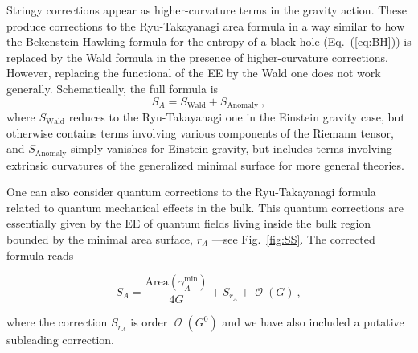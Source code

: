 \documentclass[twocolumn]{revtex4}
\providecommand{\eq}[2]{
    \begin{equation}
        #2
    \label{eq:#1}
    \end{equation}
}
\DeclareMathOperator{\calO}{\mathcal{O}}
\begin{document}
Stringy corrections appear as higher-curvature terms in the gravity action. These produce corrections to the Ryu-Takayanagi area formula in a way similar to 
how the Bekenstein-Hawking formula for the entropy of a black hole (Eq.~(\ref{eq:BH})) is replaced by the Wald formula \cite{iyer_properties_1994} in the presence of higher-curvature corrections. However, replacing the functional of the EE by the Wald one does not work generally. Schematically, the full formula is \cite{dong_holographic_2014}
\begin{equation}\label{hee}
    S_A=S_{\text{Wald}}+ S_{\text{Anomaly}} \ ,
\end{equation}
where $S_{\text{Wald}}$ reduces to the Ryu-Takayanagi one in the Einstein gravity case, but otherwise contains terms involving various components of the Riemann tensor, and $S_{\text{Anomaly}}$ simply vanishes for Einstein gravity, but includes terms involving extrinsic curvatures of the generalized minimal surface for more general theories. %



One can also consider quantum corrections to the Ryu-Takayanagi formula related to quantum mechanical effects in the bulk. This quantum corrections are essentially given by the EE of quantum fields living inside the bulk region bounded by the minimal area surface, $r_A$ ---see Fig.~\ref{fig:SS}. The corrected formula reads \cite{faulkner_quantum_2013}
\eq{EEquantum}{
    S_A = \frac{\text{Area} (\gamma_A^\text{min})}{4 G} + S_{r_A} + \calO(G) \ ,
}
where the correction $S_{r_A}$ is order $\calO(G^0)$ and we have also included a putative subleading correction.
\end{document}
